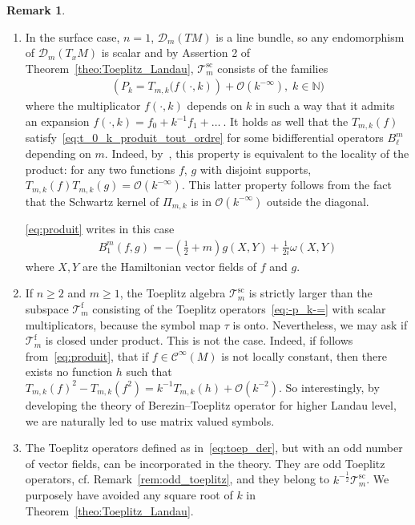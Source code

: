 \documentclass[10pt,a4paper]{article}
\theoremstyle{definition}
\newtheorem{rema}[theo]{Remark}
\numberwithin{equation}{section}
\newcommand{\N}{{\mathbb{N}}}
\newcommand{\om}{{\omega}}
\newcommand{\op}{\operatorname}
\newcommand{\Ci}{{\mathcal{C}}^{\infty}}
\newcommand{\bigo}{\mathcal{O}}
\newcommand{\D}{\mathcal{D}}
\newcommand{\clT}{\mathcal{T}}
\begin{document}
\break
\begin{rema}\leavevmode \label{rem:Toeplitz}
\begin{enumerate}
\item\label{rema1.4.1} In the surface case, $n=1$, $\D_m(TM)$ is a line bundle, so any endomorphism of $\D_m(T_xM)$ is scalar and by Assertion 2 of Theorem~\ref{theo:Toeplitz_Landau}, $\clT_{m}^{\op{sc}}$ consists of the families
\begin{gather}\label{eq:-p_k-=}
(P_k = T_{m,k} \big(f(\cdot, k)) + \bigo (k^{-\infty}), \; k \in \N\big)
\end{gather}
where the multiplicator $f(\cdot, k)$ depends on $k$ in such a way that it admits an expansion $f(\cdot, k) = f_0 + k^{-1} f_1 + \ldots\ $. It holds as well that the $T_{m,k} (f)$ satisfy~\eqref{eq:t_0_k_produit_tout_ordre} for some bidifferential operators $B_\ell^m$ depending on $m$. Indeed, by~\cite[Section~5.4]{oim}, this property is equivalent to the locality of the product: for any two functions $f$, $g$ with disjoint supports, $T_{m,k} (f) T_{m,k} (g) = \bigo (k^{-\infty})$. This latter property follows from the fact that the Schwartz kernel of $\Pi_{m,k}$ is in $\bigo (k^{-\infty})$ outside the diagonal. 

\eqref{eq:produit} writes in this case
\begin{gather}\label{eq:bm_1-f-g}
B^m_1 (f,g) = - \left(\tfrac{1}{2} +m\right) g(X,Y) + \tfrac{1}{2i} \om (X,Y)
\end{gather}
where $X,Y$ are the Hamiltonian vector fields of $f$ and $g$.

\item\label{rema1.4.2} If $n \geqslant 2$ and $m\geqslant 1$, the Toeplitz algebra $\clT_m^{\op{sc}}$ is strictly larger than the subspace $
\clT_m^{\op{f}}$ consisting of the Toeplitz operators~\eqref{eq:-p_k-=} with scalar multiplicators, because the symbol map $\tau $ is onto. Nevertheless, we may ask if $ \clT_m^{\op{f}}$ is closed under product. This is not the case. Indeed, if follows from~\eqref{eq:produit}, that if $f \in \Ci (M)$ is not locally constant, then there exists no function $h$ such that $T_{m,k} (f)^2 - T_{m,k} (f^2) = k^{-1} T_{m,k} (h) + \bigo (k^{-2})$. So interestingly, by developing the theory of Berezin--Toeplitz operator for higher Landau level, we are naturally led to use matrix valued symbols.
\item\label{rema1.4.3}  The Toeplitz operators defined as in~\eqref{eq:toep_der}, but with an odd number of vector fields, can be incorporated in the theory. They are odd Toeplitz operators, cf. Remark~\ref{rem:odd_toeplitz}, and they belong to $k^{-\frac{1}{2} } \clT_m^{\op{sc}}$. We purposely have avoided any square root of $k$ in Theorem~\ref{theo:Toeplitz_Landau}.
\end{enumerate}
\end{rema}
\end{document}

